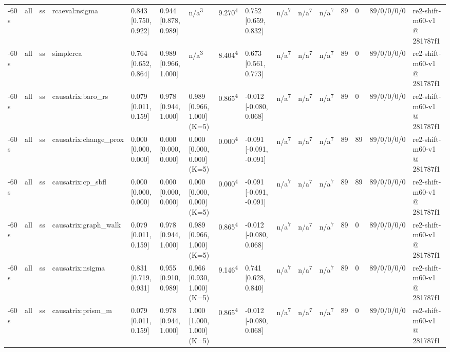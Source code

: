 \begin{table}[t]
\begin{tabular}{llllllllllllllll}
-60 s & all & ss & rcaeval:nsigma & 0.843 [0.750, 0.922] & 0.944 [0.878, 0.989] & n/a\textsuperscript{3} & 9.270\textsuperscript{4} & 0.752 [0.659, 0.832] & n/a\textsuperscript{7} & n/a\textsuperscript{7} & n/a\textsuperscript{7} & 89 & 0 & 89/0/0/0/0 & re2-shift-m60-v1 @ 281787f1 \\
-60 s & all & ss & simplerca & 0.764 [0.652, 0.864] & 0.989 [0.966, 1.000] & n/a\textsuperscript{3} & 8.404\textsuperscript{4} & 0.673 [0.561, 0.773] & n/a\textsuperscript{7} & n/a\textsuperscript{7} & n/a\textsuperscript{7} & 89 & 0 & 89/0/0/0/0 & re2-shift-m60-v1 @ 281787f1 \\
-60 s & all & ss & causatrix:baro\_rs & 0.079 [0.011, 0.159] & 0.978 [0.944, 1.000] & 0.989 [0.966, 1.000] (K=5) & 0.865\textsuperscript{4} & -0.012 [-0.080, 0.068] & n/a\textsuperscript{7} & n/a\textsuperscript{7} & n/a\textsuperscript{7} & 89 & 0 & 89/0/0/0/0 & re2-shift-m60-v1 @ 281787f1 \\
-60 s & all & ss & causatrix:change\_prox & 0.000 [0.000, 0.000] & 0.000 [0.000, 0.000] & 0.000 [0.000, 0.000] (K=5) & 0.000\textsuperscript{4} & -0.091 [-0.091, -0.091] & n/a\textsuperscript{7} & n/a\textsuperscript{7} & n/a\textsuperscript{7} & 89 & 89 & 89/0/0/0/0 & re2-shift-m60-v1 @ 281787f1 \\
-60 s & all & ss & causatrix:cp\_sbfl & 0.000 [0.000, 0.000] & 0.000 [0.000, 0.000] & 0.000 [0.000, 0.000] (K=5) & 0.000\textsuperscript{4} & -0.091 [-0.091, -0.091] & n/a\textsuperscript{7} & n/a\textsuperscript{7} & n/a\textsuperscript{7} & 89 & 89 & 89/0/0/0/0 & re2-shift-m60-v1 @ 281787f1 \\
-60 s & all & ss & causatrix:graph\_walk & 0.079 [0.011, 0.159] & 0.978 [0.944, 1.000] & 0.989 [0.966, 1.000] (K=5) & 0.865\textsuperscript{4} & -0.012 [-0.080, 0.068] & n/a\textsuperscript{7} & n/a\textsuperscript{7} & n/a\textsuperscript{7} & 89 & 0 & 89/0/0/0/0 & re2-shift-m60-v1 @ 281787f1 \\
-60 s & all & ss & causatrix:nsigma & 0.831 [0.719, 0.931] & 0.955 [0.910, 0.989] & 0.966 [0.930, 1.000] (K=5) & 9.146\textsuperscript{4} & 0.741 [0.628, 0.840] & n/a\textsuperscript{7} & n/a\textsuperscript{7} & n/a\textsuperscript{7} & 89 & 0 & 89/0/0/0/0 & re2-shift-m60-v1 @ 281787f1 \\
-60 s & all & ss & causatrix:prism\_m & 0.079 [0.011, 0.159] & 0.978 [0.944, 1.000] & 1.000 [1.000, 1.000] (K=5) & 0.865\textsuperscript{4} & -0.012 [-0.080, 0.068] & n/a\textsuperscript{7} & n/a\textsuperscript{7} & n/a\textsuperscript{7} & 89 & 0 & 89/0/0/0/0 & re2-shift-m60-v1 @ 281787f1 \\

\end{tabular}
\end{table}
